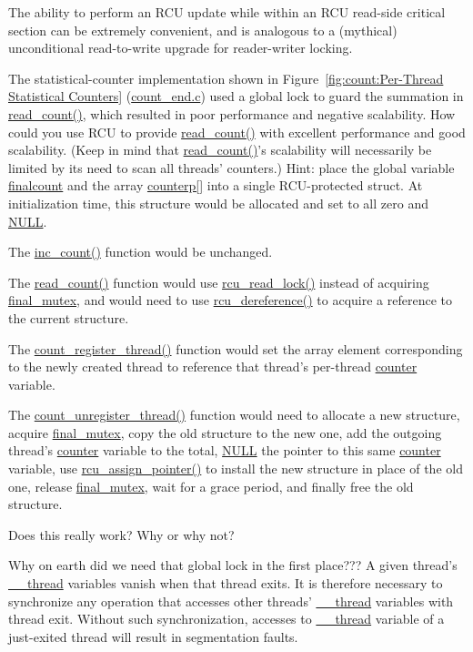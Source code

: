 	The ability to perform an RCU update while within an RCU read-side
	critical section can be extremely convenient, and is analogous
	to a (mythical) unconditional read-to-write upgrade for
	reader-writer locking.

\QuickQ{}
	The statistical-counter implementation shown in
	Figure~\ref{fig:count:Per-Thread Statistical Counters}
	(\url{count_end.c})
	used a global lock to guard the summation in \url{read_count()},
	which resulted in poor performance and negative scalability.
	How could you use RCU to provide \url{read_count()} with
	excellent performance and good scalability.
	(Keep in mind that \url{read_count()}'s scalability will
	necessarily be limited by its need to scan all threads'
	counters.)
\QuickA{}
	Hint: place the global variable \url{finalcount} and the
	array \url{counterp[]} into a single RCU-protected struct.
	At initialization time, this structure would be allocated
	and set to all zero and \url{NULL}.

	The \url{inc_count()} function would be unchanged.

	The \url{read_count()} function would use \url{rcu_read_lock()}
	instead of acquiring \url{final_mutex}, and would need to
	use \url{rcu_dereference()} to acquire a reference to the
	current structure.

	The \url{count_register_thread()} function would set the
	array element corresponding to the newly created thread
	to reference that thread's per-thread \url{counter} variable.

	The \url{count_unregister_thread()} function would need to
	allocate a new structure, acquire \url{final_mutex},
	copy the old structure to the new one, add the outgoing
	thread's \url{counter} variable to the total, \url{NULL}
	the pointer to this same \url{counter} variable,
	use \url{rcu_assign_pointer()} to install the new structure
	in place of the old one, release \url{final_mutex},
	wait for a grace period, and finally free the old structure.

	Does this really work?
	Why or why not?

\QuickQ{}
	Why on earth did we need that global lock in the first place???
\QuickA{}
	A given thread's \url{__thread} variables vanish when that
	thread exits.
	It is therefore necessary to synchronize any operation that
	accesses other threads' \url{__thread} variables with
	thread exit.
	Without such synchronization, accesses to \url{__thread} variable
	of a just-exited thread will result in segmentation faults.

